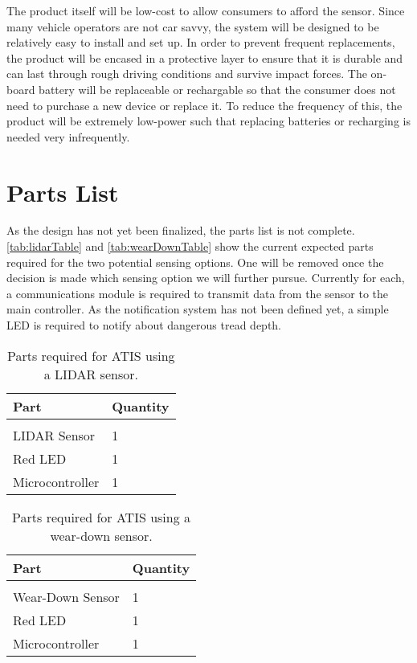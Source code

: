 \documentclass[11pt]{IEEEtran}
\begin{document}
		The product itself will be low-cost to allow consumers to afford the sensor. Since many vehicle operators are not car savvy, the system will be designed to be relatively easy to install and set up. In order to prevent frequent replacements, the product will be encased in a protective layer to ensure that it is durable and can last through rough driving conditions and survive impact forces. The on-board battery will be replaceable or rechargable so that the consumer does not need to purchase a new device or replace it. To reduce the frequency of this, the product will be extremely low-power such that replacing batteries or recharging is needed very infrequently.

	\section{Parts List}
		As the design has not yet been finalized, the parts list is not complete. \autoref{tab:lidarTable} and \autoref{tab:wearDownTable} show the current expected parts required for the two potential sensing options. One will be removed once the decision is made which sensing option we will further pursue. Currently for each, a communications module is required to transmit data from the sensor to the main controller. As the notification system has not been defined yet, a simple LED is required to notify about dangerous tread depth. 

		\begin{table}[b]
			\begin{center}
				\caption{Parts required for ATIS using a LIDAR sensor.}
				\label{tab:lidarTable}
				\begin{tabular}{l|l}
					Part 			& Quantity  \\
					\hline
					\vspace{-0.1in}	&	\\
					LIDAR Sensor 	& 1 \\
					Red LED 		& 1 \\
					Microcontroller	& 1 
				\end{tabular}
			\end{center}
		\end{table}

		\begin{table}[t]
			\begin{center}
				\caption{Parts required for ATIS using a wear-down sensor.}
				\label{tab:wearDownTable}
				\begin{tabular}{l|l}
					Part 				& Quantity  \\
					\hline
					\vspace{-0.1in}		&	\\
					Wear-Down Sensor 	& 1 \\
					Red LED 			& 1 \\
					Microcontroller 	& 1
				\end{tabular}
			\end{center}
		\end{table}
\end{document}
